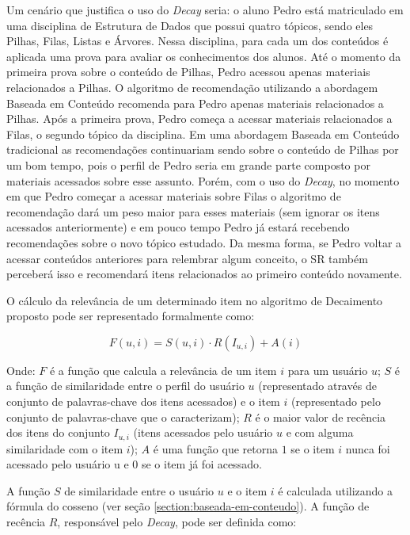 Um cenário que justifica o uso do \textit{Decay} seria: o aluno Pedro está matriculado em uma disciplina de Estrutura de Dados
que possui quatro tópicos, sendo eles Pilhas, Filas, Listas e Árvores. Nessa disciplina, para cada um dos conteúdos é
aplicada uma prova para avaliar os conhecimentos dos alunos. Até o momento da primeira prova sobre o conteúdo de Pilhas,
Pedro acessou apenas materiais relacionados a Pilhas. O algoritmo de recomendação utilizando a abordagem Baseada em
Conteúdo recomenda para Pedro apenas materiais relacionados a Pilhas. Após a primeira prova, Pedro começa a acessar
materiais relacionados a Filas, o segundo tópico da disciplina. Em uma abordagem Baseada em Conteúdo tradicional as
recomendações continuariam sendo sobre o conteúdo de Pilhas por um bom tempo, pois o perfil de Pedro seria em grande
parte composto por materiais acessados sobre esse assunto. Porém, com o uso do \textit{Decay}, no momento em que Pedro começar a
acessar materiais sobre Filas o algoritmo de recomendação dará um peso maior para esses materiais (sem ignorar os itens
acessados anteriormente) e em pouco tempo Pedro já estará recebendo recomendações sobre o novo tópico estudado. Da mesma
forma, se Pedro voltar a acessar conteúdos anteriores para relembrar algum conceito, o SR também perceberá isso e
recomendará itens relacionados ao primeiro conteúdo novamente.

O cálculo da relevância de um determinado item no algoritmo de Decaimento proposto pode ser representado formalmente
como:

\begin{equation}
  F(u,i) = S(u,i) \cdot R(I_{u,i}) + A(i)
  \label{eq:relevancia-proposta}
\end{equation}

Onde: $F$ é a função que calcula a relevância de um item $i$ para um usuário $u$; $S$ é a função de similaridade entre
o perfil do usuário $u$ (representado através de conjunto de palavras-chave dos itens acessados) e o item $i$
(representado pelo conjunto de palavras-chave que o caracterizam); $R$ é o maior valor de recência dos itens do conjunto
$I_{u,i}$ (itens acessados pelo usuário $u$ e com alguma similaridade com o item $i$); $A$ é uma função que retorna $1$
se o item $i$ nunca foi acessado pelo usuário u e $0$ se o item já foi acessado.

A função $S$ de similaridade entre o usuário $u$ e o item $i$ é calculada utilizando a fórmula do cosseno (ver seção
\ref{section:baseada-em-conteudo}). A função de recência $R$, responsável pelo \textit{Decay}, pode ser definida como:

